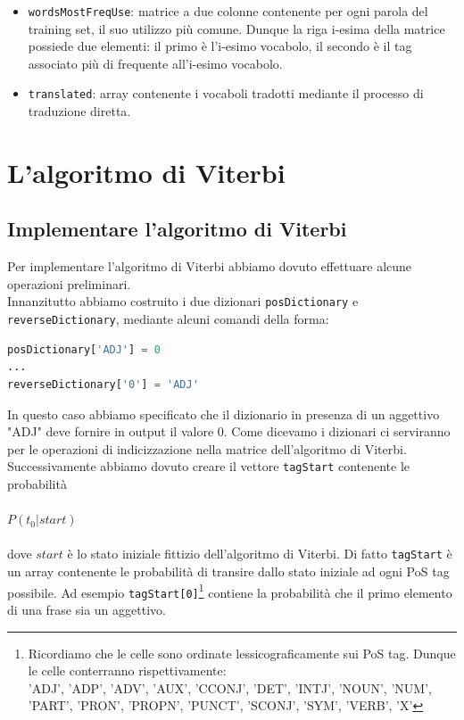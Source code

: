 \documentclass[10pt]{article}
\begin{document}
\begin{itemize}
	\item \texttt{wordsMostFreqUse}: matrice a due colonne contenente per ogni parola del training set, il suo utilizzo più comune. Dunque la riga i-esima della matrice possiede due elementi: il primo è l'i-esimo vocabolo, il secondo è il tag associato più di frequente all'i-esimo vocabolo.
	
	\item \texttt{translated}: array contenente i vocaboli tradotti mediante il processo di traduzione diretta.
\end{itemize}

\section{L'algoritmo di Viterbi}
\subsection{Implementare l'algoritmo di Viterbi}
Per implementare l'algoritmo di Viterbi abbiamo dovuto effettuare alcune operazioni preliminari.\\
Innanzitutto abbiamo costruito i due dizionari \texttt{posDictionary} e\\
\texttt{reverseDictionary}, mediante alcuni comandi della forma:
\begin{lstlisting}[language=Python]
posDictionary['ADJ'] = 0
...
reverseDictionary['0'] = 'ADJ'
\end{lstlisting}
In questo caso abbiamo specificato che il dizionario in presenza di un aggettivo "ADJ" deve fornire in output il valore 0. Come dicevamo i dizionari ci serviranno per le operazioni di indicizzazione nella matrice dell'algoritmo di Viterbi.\\
Successivamente abbiamo dovuto creare il vettore \texttt{tagStart} contenente le probabilità\\
\\
$P(t_0 | start)$\\
\\
dove $start$ è lo stato iniziale fittizio dell'algoritmo di Viterbi. Di fatto \texttt{tagStart} è un array contenente le probabilità di transire dallo stato iniziale ad ogni PoS tag possibile. Ad esempio \texttt{tagStart[0]}\footnote{Ricordiamo che le celle sono ordinate lessicograficamente sui PoS tag. Dunque le celle conterranno rispettivamente:\\ 'ADJ', 'ADP', 'ADV', 'AUX', 'CCONJ', 'DET', 'INTJ', 'NOUN', 'NUM', 'PART', 'PRON', 'PROPN', 'PUNCT', 'SCONJ', 'SYM', 'VERB', 'X'} contiene la probabilità che il primo elemento di una frase sia un aggettivo.\\
\end{document}
